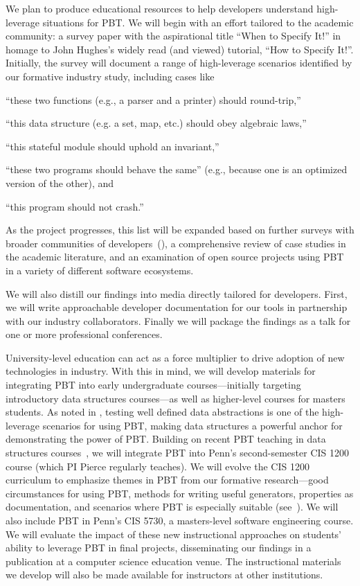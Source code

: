 We plan to produce educational resources to help developers understand
high-leverage situations for PBT. We will begin with an effort
tailored to the academic community: a survey paper with the
aspirational title ``When to Specify It!'' in homage to John Hughes's
widely read (and viewed) tutorial, ``How to Specify It!''. Initially,
the survey will
document a  range of high-leverage scenarios identified by our formative
industry study, including cases like
\begin{enumerate*}[label=(\arabic{enumi})]
\item ``these two functions (e.g., a parser and a printer) should round-trip,''
\item ``this data structure (e.g. a set, map, etc.) should obey algebraic laws,''
\item ``this stateful module should uphold an invariant,''
\item ``these two programs should behave the same'' (e.g., because one
is an optimized version of the other),
and
\item ``this program should not crash.''
\end{enumerate*}
As the project progresses, this list will be expanded based on
further surveys with broader
communities of developers~(), a comprehensive
review of case studies in
the academic literature, and an examination of open source projects
using PBT in a
variety of different software ecosystems.

We will also distill our findings
into media directly tailored for developers. First, we will write
approachable developer documentation for our tools in partnership with
our industry
collaborators. Finally we will package the findings as a talk for one or more
professional conferences.

%
University-level education can act as a force
multiplier to drive adoption of new
technologies in industry.
With this in mind, we will develop materials for
integrating PBT into early undergraduate courses---initially targeting
introductory data structures
courses---as well as higher-level courses for masters students. As
noted in , testing well defined data
abstractions is one of the high-leverage scenarios for using PBT, making data
structures a powerful anchor for demonstrating the power of PBT.
%
Building on
recent PBT teaching in data structures
courses~\cite{wrenn2021using, nelson2021automated}, we will integrate PBT into
Penn's second-semester CIS 1200 course (which PI Pierce regularly teaches).
%
We
will evolve the CIS 1200 curriculum to emphasize themes in PBT from our
formative research---good circumstances for
using PBT, methods for writing useful generators, properties as
documentation, and scenarios where PBT is especially suitable
(see~).
%
We will also include PBT in Penn's CIS 5730, a masters-level software
engineering course.
%
We will evaluate the impact of these new
instructional approaches on students' ability to leverage PBT in final projects,
disseminating our findings in a publication at a computer science
education venue.
%
The instructional materials we develop will also be made available for
instructors at other institutions.

